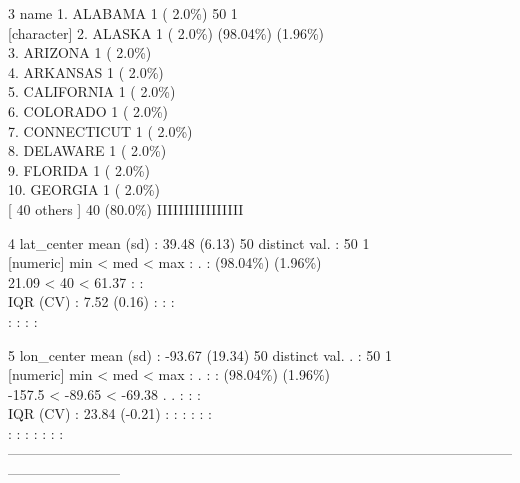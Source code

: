 \documentclass[]{article}
\begin{document}
3 name 1. ALABAMA 1 ( 2.0\%) 50 1\\
{[}character{]} 2. ALASKA 1 ( 2.0\%) (98.04\%) (1.96\%)\\
3. ARIZONA 1 ( 2.0\%)\\
4. ARKANSAS 1 ( 2.0\%)\\
5. CALIFORNIA 1 ( 2.0\%)\\
6. COLORADO 1 ( 2.0\%)\\
7. CONNECTICUT 1 ( 2.0\%)\\
8. DELAWARE 1 ( 2.0\%)\\
9. FLORIDA 1 ( 2.0\%)\\
10. GEORGIA 1 ( 2.0\%)\\
{[} 40 others {]} 40 (80.0\%) IIIIIIIIIIIIIIII

4 lat\_center mean (sd) : 39.48 (6.13) 50 distinct val. : 50 1\\
{[}numeric{]} min \textless{} med \textless{} max : . : (98.04\%)
(1.96\%)\\
21.09 \textless{} 40 \textless{} 61.37 : :\\
IQR (CV) : 7.52 (0.16) : : :\\
: : : :

5 lon\_center mean (sd) : -93.67 (19.34) 50 distinct val. . : 50 1\\
{[}numeric{]} min \textless{} med \textless{} max : . : : (98.04\%)
(1.96\%)\\
-157.5 \textless{} -89.65 \textless{} -69.38 . . : : :\\
IQR (CV) : 23.84 (-0.21) : : : : : :\\
: : : : : : :\\
------------------------------------------------------------------------------------------------------------------------------------
\end{document}
